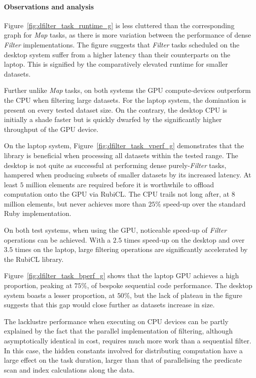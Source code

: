 \paragraph*{Observations and analysis}
Figure~\ref{fig:dfilter_task_runtime_g} is less cluttered than the corresponding graph for \emph{Map} tasks, as there is more variation between the performance of dense \emph{Filter} implementations.
The figure suggests that \emph{Filter} tasks scheduled on the desktop system suffer from a higher latency than their counterparts on the laptop. This is signified by the comparatively elevated runtime for smaller datasets.

Further unlike \emph{Map} tasks, on both systems the \ac{GPU} compute-devices outperform the \ac{CPU} when filtering large datasets. For the laptop system, the domination is present on every tested dataset size. On the contrary, the desktop \ac{CPU} is initially a shade faster but is quickly dwarfed by the significantly higher throughput of the \ac{GPU} device.

On the laptop system, Figure~\ref{fig:dfilter_task_vperf_g} demonstrates that the library is beneficial when processing all datasets within the tested range. The desktop is not quite as successful at performing dense purely-\emph{Filter} tasks, hampered when producing subsets of smaller datasets by its increased latency. At least $5$ million elements are required before it is worthwhile to offload computation onto the \ac{GPU} via RubiCL. The \ac{CPU} trails not long after, at $8$ million elements, but never achieves more than $25\%$ speed-up over the standard Ruby implementation.

On both test systems, when using the \ac{GPU}, noticeable speed-up of \emph{Filter} operations can be achieved. With a $2.5$ times speed-up on the desktop and over $3.5$ times on the laptop, large filtering operations are significantly accelerated by the RubiCL library.

Figure~\ref{fig:dfilter_task_bperf_g} shows that the laptop \ac{GPU} achieves a high proportion, peaking at $75\%$, of bespoke sequential code performance. The desktop system boasts a lesser proportion, at $50\%$, but the lack of plateau in the figure suggests that this gap would close further as datasets increase in size.

The lacklustre performance when executing on \ac{CPU} devices can be partly explained by the fact that the parallel implementation of filtering, although asymptotically identical in cost, requires much more work than a sequential filter. In this case, the hidden constants involved for distributing computation have a large effect on the task duration, larger than that of parallelising the predicate scan and index calculations along the data.

